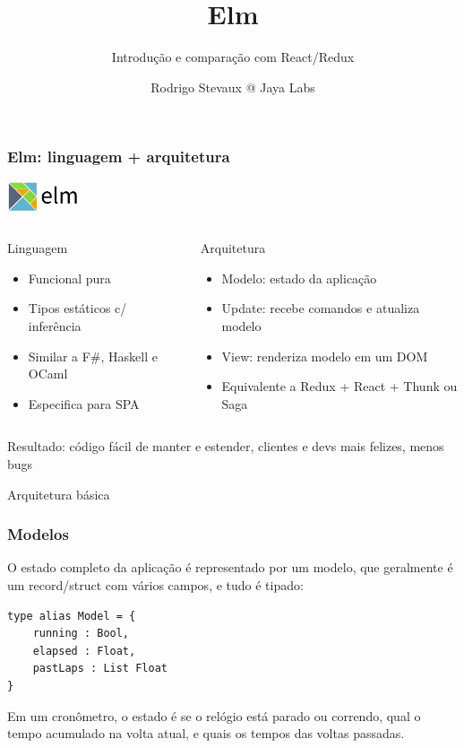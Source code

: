 \documentclass[10pt]{beamer}
\title{Elm}
\subtitle{Introdução e comparação com React/Redux}
\author{Rodrigo Stevaux @ Jaya Labs}
\begin{document}
	
\begin{frame}
\maketitle
\end{frame}


\begin{frame}[t]
	\frametitle{Elm: linguagem + arquitetura}
	\bigskip
	\hspace{-0.3cm}\includegraphics[height=24pt]{logo.png}
	\begin{columns}[T]
		\begin{column}{0.5\textwidth}
			\begin{block}{Linguagem}
				\begin{itemize}
					\item Funcional pura
					\item Tipos estáticos c/ inferência
					\item Similar a F\#, Haskell e OCaml
					\item Especifica para SPA
				\end{itemize}
			\end{block}
		\end{column}
		\begin{column}{0.5\textwidth}
			\begin{block}{Arquitetura}
				\begin{itemize}
					\item Modelo: estado da aplicação
					\item Update: recebe comandos e atualiza modelo
					\item View: renderiza modelo em um DOM
					\item Equivalente a Redux + React + Thunk ou Saga
				\end{itemize}
			\end{block}
		\end{column}
	\end{columns}
	\bigskip
	Resultado: código fácil de manter e estender, clientes e devs mais felizes, menos bugs
\end{frame}

\begin{frame}
	\Huge{Arquitetura básica}
\end{frame}


\begin{frame}[fragile]
\frametitle{Modelos}
	O estado completo da aplicação é representado por um modelo, que geralmente é um record/struct com vários campos, e tudo é tipado:
	\bigskip
    \begin{verbatim}
type alias Model = {
	running : Bool,
	elapsed : Float,
	pastLaps : List Float 
}
    \end{verbatim}
    \bigskip
    Em um cronômetro, o estado é se o relógio está parado ou correndo, qual o tempo acumulado na volta atual, e quais os tempos das voltas passadas.
\end{frame}
\end{document}
